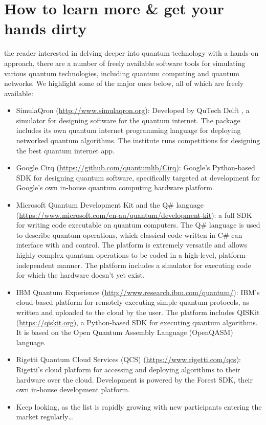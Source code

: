 %
%

\section{How to learn more \& get your hands dirty}

 the reader interested in delving deeper into quantum technology with a hands-on approach, there are a number of freely available software tools for simulating various quantum technologies, including quantum computing and quantum networks. We highlight some of the major ones below, all of which are freely available:

\begin{itemize}
	\item SimulaQron (\href{http://www.simulaqron.org}{http://www.simulaqron.org}): Developed by QuTech Delft \cite{bib:AxelDahlbergQron}, a simulator for designing software for the quantum internet. The package includes its own quantum internet programming language for deploying networked quantum algorithms. The institute runs competitions for designing the best quantum internet app.
	\item Google Cirq (\href{https://github.com/quantumlib/Cirq}{https://github.com/quantumlib/Cirq}): Google's Python-based SDK for designing quantum software, specifically targeted at development for Google's own in-house quantum computing hardware platform.
	\item Microsoft Quantum Development Kit and the Q\# language (\href{https://www.microsoft.com/en-au/quantum/development-kit}{https://www.microsoft.com/en-au/quantum/development-kit}): a full SDK for writing code executable on quantum computers. The Q\# language is used to describe quantum operations, which classical code written in C\# can interface with and control. The platform is extremely versatile and allows highly complex quantum operations to be coded in a high-level, platform-independent manner. The platform includes a simulator for executing code for which the hardware doesn't yet exist.
	\item IBM Quantum Experience (\href{http://www.research.ibm.com/quantum/}{http://www.research.ibm.com/quantum/}): IBM's cloud-based platform for remotely executing simple quantum protocols, as written and uploaded to the cloud by the user. The platform includes QISKit (\href{https://qiskit.org}{https://qiskit.org}), a Python-based SDK for executing quantum algorithms. It is based on the Open Quantum Assembly Language (OpenQASM) language.
	\item Rigetti Quantum Cloud Services (QCS) (\href{https://www.rigetti.com/qcs}{https://www.rigetti.com/qcs}): Rigetti's cloud platform for accessing and deploying algorithms to their hardware over the cloud. Development is powered by the Forest SDK, their own in-house development platform.
	\item Keep looking, as the list is rapidly growing with new participants entering the market regularly\ldots
\end{itemize}
